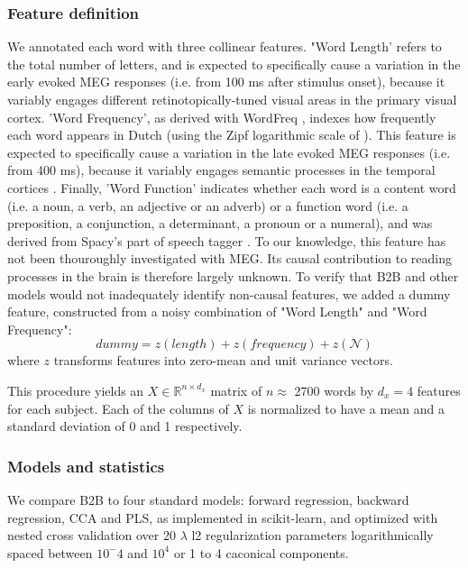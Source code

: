 \subsubsection{Feature definition}
We annotated each word with three collinear features.
%
"Word Length' refers to the total number of letters, and is expected to specifically cause a variation in the early evoked MEG responses (i.e. from 100 ms after stimulus onset), because it variably engages different retinotopically-tuned visual areas in the primary visual cortex.
%
'Word Frequency', as derived with WordFreq \citep{speerwordfreq}, indexes how frequently each word appears in Dutch (using the Zipf logarithmic scale of \citep{van2014subtlex}). This feature is expected to specifically cause a variation in the late evoked MEG responses (i.e. from 400 ms), because it variably engages semantic processes in the temporal cortices \citep{kutas2011thirty}.
%
Finally, 'Word Function' indicates whether each word is a content word (i.e. a noun, a verb, an adjective or an adverb) or a function word (i.e. a preposition, a conjunction, a determinant, a pronoun or a numeral), and was derived from Spacy's part of speech tagger \citep{spacy2}. To our knowledge, this feature has not been thouroughly investigated with MEG. Its causal contribution to reading processes in the brain is therefore largely unknown.
%
To verify that B2B and other models would not inadequately identify non-causal features, we added a dummy feature, constructed from a noisy combination of "Word Length" and "Word Frequency":
\begin{equation}
  dummy = z(length) + z(frequency) + z(\mathcal{N})
\end{equation}
where $z$ transforms features into zero-mean and unit variance vectors.

This procedure yields an $X \in \mathbb{R}^{n \times d_x}$ matrix of $n\approx$ 2700 words by
$d_x=4$ features for each subject. Each of the columns of $X$ is normalized to
have a mean and a standard deviation of 0 and 1 respectively.

\subsubsection{Models and statistics}

We compare B2B to four standard models: forward regression, backward regression, CCA and PLS, as implemented in scikit-learn, and optimized with nested cross validation over 20 $\lambda$ l2 regularization parameters logarithmically spaced between $10^-4$ and $10^4$ or 1 to 4 caconical components.

